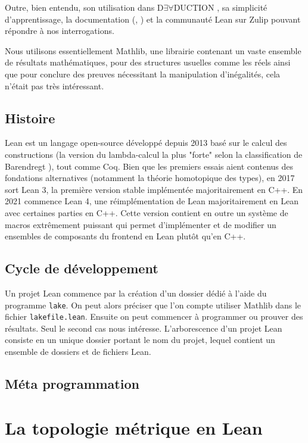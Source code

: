 \documentclass[a4paper, 12pt]{article}
\begin{document}
Outre, bien entendu, son utilisation dans D$\exists\forall$DUCTION \cite{deaduction}, sa simplicité d'apprentissage, la documentation (\cite{theorem_proving}, \cite{math_in_lean}) et la communauté Lean sur Zulip pouvant répondre à nos interrogations.

Nous utilisons essentiellement Mathlib, une librairie contenant un vaste ensemble de résultats mathématiques, pour des structures usuelles comme les réels ainsi que pour conclure des preuves nécessitant la manipulation d'inégalités, cela n'était pas très intéressant.

\subsection{Histoire}

Lean est un langage open-source développé depuis 2013 basé sur le calcul des constructions (la version du lambda-calcul la plus "forte" selon la classification de Barendregt \cite{Barendregt_1991}), tout comme Coq. Bien que les premiers essais aient contenus des fondations alternatives (notamment la théorie homotopique des types), en 2017 sort Lean 3, la première version stable implémentée majoritairement en C++. En 2021 commence Lean 4, une réimplémentation de Lean majoritairement en Lean avec certaines parties en C++. Cette version contient en outre un système de macros extrêmement puissant qui permet d'implémenter et de modifier un ensembles de composants du frontend en Lean plutôt qu'en C++.

\subsection{Cycle de développement}

Un projet Lean commence par la création d'un dossier dédié à l'aide du programme \texttt{lake}. On peut alors préciser que l'on compte utiliser Mathlib dans le fichier \texttt{lakefile.lean}. Ensuite on peut commencer à programmer ou prouver des résultats. Seul le second cas nous intéresse. L'arborescence d'un projet Lean consiste en un unique dossier portant le nom du projet, lequel contient un ensemble de dossiers et de fichiers Lean.

\subsection{Méta programmation}


\section{La topologie métrique en Lean}
\end{document}
